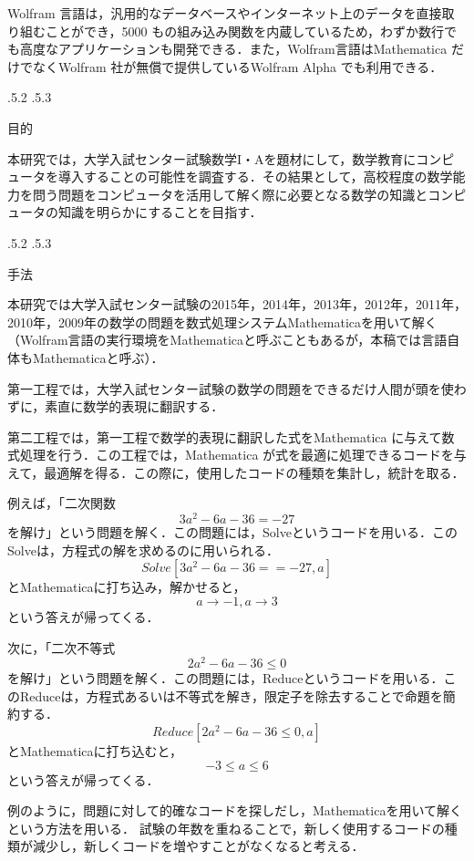 \documentclass[uplatex,twocolumn]{jsarticle}
\makeatletter
\renewcommand{\section}{%
    \if@slide\clearpage\fi
    \@startsection{section}{1}{\z@}%
    {\Cvs \@plus.5\Cdp \@minus.2\Cdp}%
    {.5\Cvs \@plus.3\Cdp}%
    {\normalfont\raggedright}}
\makeatother
\begin{document}
Wolfram 言語は，汎用的なデータベースやインターネット上のデータを直接取り組むことができ，5000 もの組み込み関数を内蔵しているため，わずか数行でも高度なアプリケーションも開発できる．また，Wolfram言語はMathematica だけでなくWolfram 社が無償で提供しているWolfram Alpha でも利用できる\cite{mitubisi}．



\section{目的}

本研究では，大学入試センター試験数学I・Aを題材にして，数学教育にコンピュータを導入することの可能性を調査する．その結果として，高校程度の数学能力を問う問題をコンピュータを活用して解く際に必要となる数学の知識とコンピュータの知識を明らかにすることを目指す．





\section{手法}

本研究では大学入試センター試験の2015年，2014年，2013年，2012年，2011年，2010年，2009年の数学の問題を数式処理システムMathematicaを用いて解く （Wolfram言語の実行環境をMathematicaと呼ぶこともあるが，本稿では言語自体もMathematicaと呼ぶ）．

第一工程では，大学入試センター試験の数学の問題をできるだけ人間が頭を使わずに，素直に数学的表現に翻訳する．

第二工程では，第一工程で数学的表現に翻訳した式をMathematica に与えて数式処理を行う．この工程では，Mathematica が式を最適に処理できるコードを与えて，最適解を得る．この際に，使用したコードの種類を集計し，統計を取る．

例えば，「二次関数\[3a^2 -6a-36=-27\]を解け」という問題を解く．この問題には，Solveというコードを用いる．このSolveは，方程式の解を求めるのに用いられる．\[Solve[3a^2 -6a-36==-27,a]\]とMathematicaに打ち込み，解かせると，\[{{a \rightarrow -1},{a \rightarrow 3}}\]という答えが帰ってくる．

次に，「二次不等式\[2a^2 -6a-36 \le 0\]を解け」という問題を解く．この問題には，Reduceというコードを用いる．このReduceは，方程式あるいは不等式を解き，限定子を除去することで命題を簡約する．\[Reduce[2a^2 -6a-36 \le 0,a]\]とMathematicaに打ち込むと，\[-3 \le a \le 6\]という答えが帰ってくる．

例のように，問題に対して的確なコードを探しだし，Mathematicaを用いて解くという方法を用いる．
試験の年数を重ねることで，新しく使用するコードの種類が減少し，新しくコードを増やすことがなくなると考える．
\end{document}
